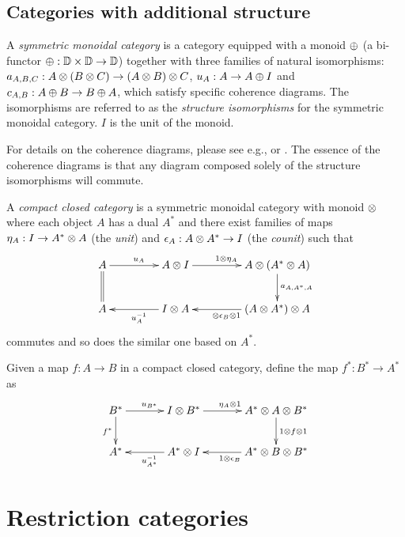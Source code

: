 \subsection{Categories with additional structure} %
\label{sub:categories_with_additional_structure}

\begin{definition}\label{symmetricmonoidalcat}
  A \emph{symmetric monoidal category} \cD{} is a category equipped with a monoid $\oplus$ (a bi-functor
  $\oplus:\mathbb{D} \times \mathbb{D} \to \mathbb{D}$) together with three families of natural isomorphisms:
  $a_{A,B,C}:A\otimes(B\otimes C) \to (A\otimes B)\otimes C$, $u_{A}:A\to A\oplus I$ and $c_{A,B}:A\oplus B \to B\oplus A$, which satisfy
  specific coherence diagrams. The isomorphisms are referred to as the \emph{structure isomorphisms}
  for the symmetric monoidal category. $I$ is the unit of the monoid.
\end{definition}
For details on the coherence diagrams, please see e.g., \cite{barr:ctcs} or
\cite{maclan97:categorieswrkmath}. The essence of the coherence diagrams is that any diagram
composed solely of the structure isomorphisms will commute.

\begin{definition}\label{def:compactclosedcat}
A \emph{compact closed category} \cD{} is a symmetric monoidal category with monoid $\otimes$ where each
object $A$ has a dual $A^{*}$ and there exist families of maps $\eta_{A}: I \to A^{*} \otimes A$ (the
\emph{unit}) and $\epsilon_{A}: A\otimes A^{*}\to I$ (the \emph{counit}) such that
\[
  \xymatrix@C+20pt{
    A \ar[r]^{u_{A}} \ar@{=}[d]  & A\*I \ar[r]^{1\*\eta_{A}}
        & A\* (A^{*}\*A) \ar[d]^{a_{A,A^{*},A}} \\
    A & I\* A \ar[l]^{u_{A}^{-1}} & (A\* A^{*})\*A \ar[l]^{\*\epsilon_{B}\*1}
    }
  \]
commutes and so does the similar one based on $A^{*}$.
\end{definition}

Given a map $f:A\to B$ in a compact closed category,  define the map $f^{*}:B^{*} \to A^{*}$ as
\[
  \xymatrix@C+10pt{
    B^{*}\ar[r]^{u_{B^{*}}} \ar[d]_{f^{*}}& I\*B^{*} \ar[r]^{\eta_{A}\*1}
      & A^{*}\*A\*B^{*}\ar[d]^{1\*f\*1}\\
    A^{*}&    A^{*}\*I\ar[l]^{u_{A^{*}}^{-1}}  &   A^{*}\*B\*B^{*}\ar[l]^{1\*\epsilon_{B}}
  }
\]



\section{Restriction categories} %
\label{sec:restriction_categories}


